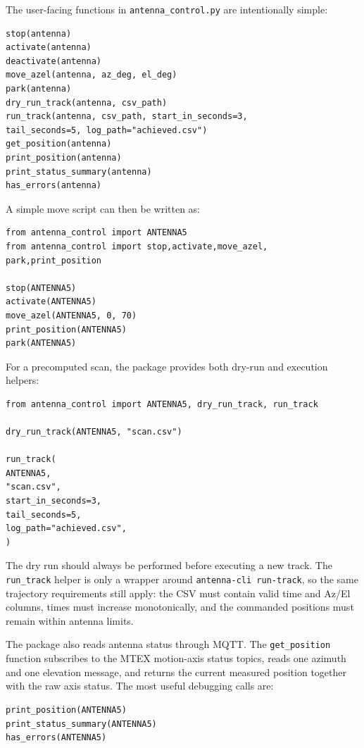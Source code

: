 \documentclass[12pt]{extarticle}
\begin{document}
The user-facing functions in \texttt{antenna\_control.py} are intentionally
simple:

\begin{lstlisting}
stop(antenna)
activate(antenna)
deactivate(antenna)
move_azel(antenna, az_deg, el_deg)
park(antenna)
dry_run_track(antenna, csv_path)
run_track(antenna, csv_path, start_in_seconds=3,
tail_seconds=5, log_path="achieved.csv")
get_position(antenna)
print_position(antenna)
print_status_summary(antenna)
has_errors(antenna)
\end{lstlisting}

A simple move script can then be written as:

\begin{lstlisting}
from antenna_control import ANTENNA5
from antenna_control import stop,activate,move_azel, park,print_position

stop(ANTENNA5)
activate(ANTENNA5)
move_azel(ANTENNA5, 0, 70)
print_position(ANTENNA5)
park(ANTENNA5)
\end{lstlisting}

For a precomputed scan, the package provides both dry-run and execution helpers:

\begin{lstlisting}
from antenna_control import ANTENNA5, dry_run_track, run_track

dry_run_track(ANTENNA5, "scan.csv")

run_track(
ANTENNA5,
"scan.csv",
start_in_seconds=3,
tail_seconds=5,
log_path="achieved.csv",
)
\end{lstlisting}

The dry run should always be performed before executing a new track. The
\texttt{run\_track} helper is only a wrapper around
\texttt{antenna-cli run-track}, so the same trajectory requirements still apply:
the CSV must contain valid time and Az/El columns, times must increase
monotonically, and the commanded positions must remain within antenna limits.

The package also reads antenna status through MQTT. The \texttt{get\_position}
function subscribes to the MTEX motion-axis status topics, reads one azimuth and
one elevation message, and returns the current measured position together with
the raw axis status. The most useful debugging calls are:

\begin{lstlisting}
print_position(ANTENNA5)
print_status_summary(ANTENNA5)
has_errors(ANTENNA5)
\end{lstlisting}
\end{document}
